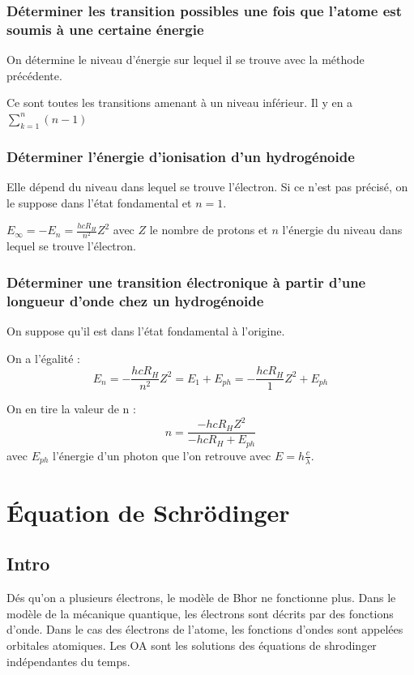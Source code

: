 \documentclass[french]{yLectureNote}
\begin{document}
\subsubsection{Déterminer les transition possibles une fois que l'atome est soumis à une certaine énergie}
On détermine le niveau d'énergie sur lequel il se trouve avec la méthode précédente.

Ce sont toutes les transitions amenant à un niveau inférieur. Il y en a $\sum^n_{k=1} (n-1)$
\subsubsection{Déterminer l'énergie d'ionisation d'un hydrogénoide}
Elle dépend du niveau dans lequel se trouve l'électron. Si ce n'est pas précisé, on le suppose dans l'état fondamental et $n=1$.

$\displaystyle E_{\infty} = - E_n =  \frac{hcR_H}{n^2}Z^2$ avec $Z$ le nombre de protons et $n$ l'énergie du niveau dans lequel se trouve l'électron.

\subsubsection{Déterminer une transition électronique à partir d'une longueur d'onde chez un hydrogénoide}
On suppose qu'il est dans l'état fondamental à l'origine.

On a l'égalité : \[E_n = -\frac{hcR_H}{n^2}Z^2 = E_1 + E_{ph} = - \frac{hcR_H}{1}Z^2 + E_{ph} \]

On en tire la valeur de n : \[ n = \frac{-hcR_HZ^2}{-hcR_H + E_{ph}} \] avec $E_{ph}$ l'énergie d'un photon que l'on retrouve avec $E = h\frac{c}{\lambda}$.
\section{Équation de Schrödinger}
\subsection{Intro}
Dés qu'on a plusieurs électrons, le modèle de Bhor ne fonctionne plus. Dans le modèle de la mécanique quantique, les électrons sont décrits par des fonctions d'onde. Dans le cas des électrons de l'atome, les fonctions d'ondes sont appelées orbitales atomiques. Les OA sont les solutions des équations de shrodinger indépendantes du temps.
\end{document}
